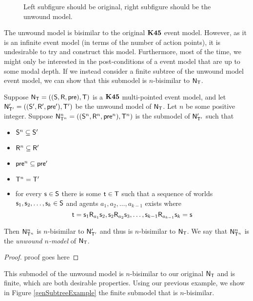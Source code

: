 \begin{figure}
\centering
\caption{\FIXME Left subfigure should be original, right subfigure should be the
unwound model.} \label{generatedTreeExample}
\end{figure}

The unwound model is bisimilar to the original $\bf K45$ event model.
However, as it is an infinite event model (in terms of the number of action
points), it is undesirable to try and construct this model.
Furthermore, most of the time, we might only be interested in the
post-conditions of a event model that are up to some modal depth.
If we instead consider a finite subtree of the unwound model event
model, we can show that this submodel is $n$-bisimilar to $\mathrm{\mathsf{N}}_\mathrm{\mathsf{T}}$.

\begin{lemma} \label{unwoundNModel}
  Suppose $\mathrm{\mathsf{N}}_\mathrm{\mathsf{T}} = ((\mathrm{\mathsf{S}},\mathrm{\mathsf{R}},\mathrm{\mathsf{pre}}),\mathrm{\mathsf{T}})$ is a $\bf K45$ multi-pointed
  event model, and let $\mathrm{\mathsf{N}}'_{\mathrm{\mathsf{T}}'} = ((\mathrm{\mathsf{S}}', \mathrm{\mathsf{R}}', \mathrm{\mathsf{pre}}'),\mathrm{\mathsf{T}}')$ be the unwound model of $\mathrm{\mathsf{N}}_\mathrm{\mathsf{T}}$.
  Let $n$ be some positive integer.
	Suppose $\mathrm{\mathsf{N}}^n_{\mathrm{\mathsf{T}}^n} = ((\mathrm{\mathsf{S}}^n,\mathrm{\mathsf{R}}^n,\mathrm{\mathsf{pre}}^n),\mathrm{\mathsf{T}}^n)$ is the submodel of $\mathrm{\mathsf{N}}'_{\mathrm{\mathsf{T}}'}$ such that
  \begin{itemize}
    \item $\mathrm{\mathsf{S}}^n \subseteq \mathrm{\mathsf{S}}'$
    \item $\mathrm{\mathsf{R}}^n \subseteq \mathrm{\mathsf{R}}'$
    \item $\mathrm{\mathsf{pre}}^n \subseteq \mathrm{\mathsf{pre}}'$
    \item $\mathrm{\mathsf{T}}^n = \mathrm{\mathsf{T}}'$
    \item for every $\mathrm{\mathsf{s}} \in \mathrm{\mathsf{S}}$ there is some $\mathrm{\mathsf{t}} \in \mathrm{\mathsf{T}}$ such that a
    sequence of worlds $\mathrm{\mathsf{s}}_1, \mathrm{\mathsf{s}}_2, \ldots, \mathrm{\mathsf{s}}_k \in \mathrm{\mathsf{S}}$ and agents
    $a_1,a_2, \ldots, a_{k-1}$ exists where
    \[
      \mathrm{\mathsf{t}} = \mathrm{\mathsf{s}}_1 \mathrm{\mathsf{R}}_{a_1} \mathrm{\mathsf{s}}_2, \mathrm{\mathsf{s}}_2 \mathrm{\mathsf{R}}_{a_2} \mathrm{\mathsf{s}}_3, \ldots,
      \mathrm{\mathsf{s}}_{k-1} \mathrm{\mathsf{R}}_{a_{k-1}} \mathrm{\mathsf{s}}_k = \mathrm{\mathsf{s}}
    \]
  \end{itemize}
  Then $\mathrm{\mathsf{N}}^n_{\mathrm{\mathsf{T}}^n}$ is $n$-bisimilar to $\mathrm{\mathsf{N}}'_{\mathrm{\mathsf{T}}'}$ and thus is
  $n$-bisimilar to $\mathrm{\mathsf{N}}_\mathrm{\mathsf{T}}$.
  We say that $\mathrm{\mathsf{N}}^n_{\mathrm{\mathsf{T}}^n}$ is the {\em unwound $n$-model} of $\mathrm{\mathsf{N}}_\mathrm{\mathsf{T}}$.
\end{lemma}
\begin{proof}
\FIXME proof goes here
\end{proof}

This submodel of the unwound model is $n$-bisimilar to our original $\mathrm{\mathsf{N}}_\mathrm{\mathsf{T}}$
and is finite, which are both desirable properties.
Using our previous example, we show in Figure \ref{genSubtreeExample} the
finite submodel that is $n$-bisimilar.

